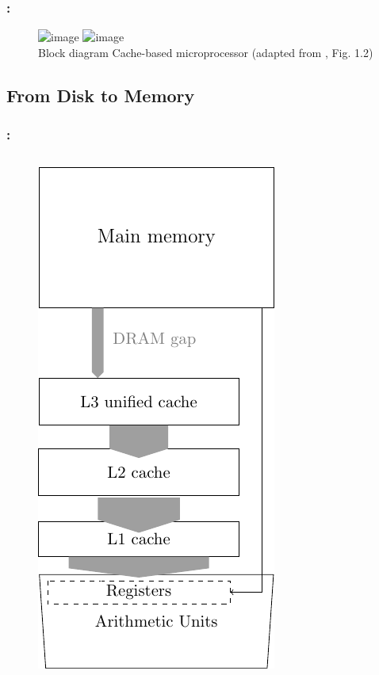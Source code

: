 \documentclass[9pt,xcolor=table]{beamer}
\begin{document}
\begin{frame}
\frametitle{\insertsectionhead{}: \insertsubsection{}}
\begin{figure}[htb]
\includegraphics<1>[height=0.65\textheight]{tikz/cachebased_microprocessor_matrix_memory_as_qm}
\includegraphics<2->[height=0.65\textheight]{tikz/cachebased_microprocessor_matrix}
\\[12pt]\large
Block diagram Cache-based microprocessor (adapted from \cite{HagerWelleinIntroHPC}, Fig. 1.2)
\end{figure}
\end{frame}


\subsection{From Disk to Memory}
\begin{frame}
\frametitle{\insertsectionhead{}: \insertsubsection{}}
\begin{columns}[c]
  \begin{column}{.45\textwidth}
    \begin{figure}[htb]
      \includegraphics[height=0.78\textheight]{tikz/dram_gap}\\[2pt]\footnotesize

\end{figure}
\end{column}
\end{columns}
\end{frame}
\end{document}
